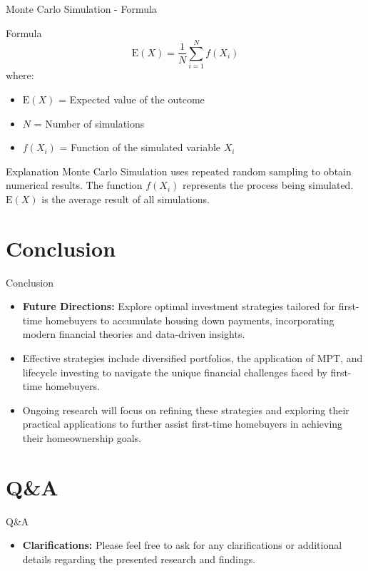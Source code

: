 \documentclass{beamer}
\begin{document}
\begin{frame}{Monte Carlo Simulation - Formula}
  \begin{block}{Formula}
    \begin{equation*}
      \text{E}(X) = \frac{1}{N} \sum_{i=1}^{N} f(X_i)
    \end{equation*}
    where:
    \begin{itemize}
      \item \( \text{E}(X) \) = Expected value of the outcome
      \item \( N \) = Number of simulations
      \item \( f(X_i) \) = Function of the simulated variable \( X_i \)
    \end{itemize}
  \end{block}
  \begin{block}{Explanation}
    Monte Carlo Simulation uses repeated random sampling to obtain numerical results. The function \( f(X_i) \) represents the process being simulated. \( \text{E}(X) \) is the average result of all simulations.
  \end{block}
\end{frame}

\section{Conclusion}
\begin{frame}{Conclusion}
    \begin{itemize}
        \item \textbf{Future Directions:} Explore optimal investment strategies tailored for first-time homebuyers to accumulate housing down payments, incorporating modern financial theories and data-driven insights.
        \item Effective strategies include diversified portfolios, the application of MPT, and lifecycle investing to navigate the unique financial challenges faced by first-time homebuyers.
        \item Ongoing research will focus on refining these strategies and exploring their practical applications to further assist first-time homebuyers in achieving their homeownership goals.
    \end{itemize}
\end{frame}

\section{Q\&A}
\begin{frame}{Q\&A}
    \begin{itemize}
        \item \textbf{Clarifications:} Please feel free to ask for any clarifications or additional details regarding the presented research and findings.
    \end{itemize}
\end{frame}
\end{document}
